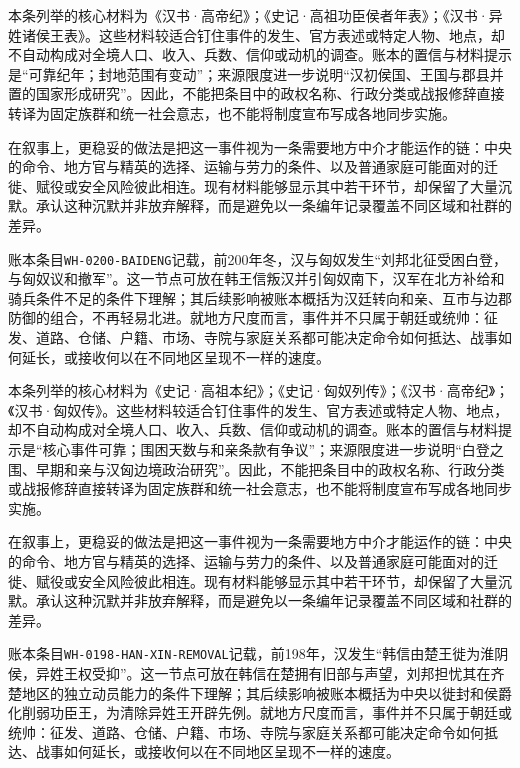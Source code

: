 本条列举的核心材料为《汉书·高帝纪》；《史记·高祖功臣侯者年表》；《汉书·异姓诸侯王表》。这些材料较适合钉住事件的发生、官方表述或特定人物、地点，却不自动构成对全境人口、收入、兵数、信仰或动机的调查。账本的置信与材料提示是“可靠纪年；封地范围有变动”；来源限度进一步说明“汉初侯国、王国与郡县并置的国家形成研究”。因此，不能把条目中的政权名称、行政分类或战报修辞直接转译为固定族群和统一社会意志，也不能将制度宣布写成各地同步实施。

在叙事上，更稳妥的做法是把这一事件视为一条需要地方中介才能运作的链：中央的命令、地方官与精英的选择、运输与劳力的条件、以及普通家庭可能面对的迁徙、赋役或安全风险彼此相连。现有材料能够显示其中若干环节，却保留了大量沉默。承认这种沉默并非放弃解释，而是避免以一条编年记录覆盖不同区域和社群的差异。

账本条目\texttt{WH-0200-BAIDENG}记载，前200年冬，汉与匈奴发生“刘邦北征受困白登，与匈奴议和撤军”。这一节点可放在韩王信叛汉并引匈奴南下，汉军在北方补给和骑兵条件不足的条件下理解；其后续影响被账本概括为汉廷转向和亲、互市与边郡防御的组合，不再轻易北进。就地方尺度而言，事件并不只属于朝廷或统帅：征发、道路、仓储、户籍、市场、寺院与家庭关系都可能决定命令如何抵达、战事如何延长，或接收何以在不同地区呈现不一样的速度。

本条列举的核心材料为《史记·高祖本纪》；《史记·匈奴列传》；《汉书·高帝纪》；《汉书·匈奴传》。这些材料较适合钉住事件的发生、官方表述或特定人物、地点，却不自动构成对全境人口、收入、兵数、信仰或动机的调查。账本的置信与材料提示是“核心事件可靠；围困天数与和亲条款有争议”；来源限度进一步说明“白登之围、早期和亲与汉匈边境政治研究”。因此，不能把条目中的政权名称、行政分类或战报修辞直接转译为固定族群和统一社会意志，也不能将制度宣布写成各地同步实施。

在叙事上，更稳妥的做法是把这一事件视为一条需要地方中介才能运作的链：中央的命令、地方官与精英的选择、运输与劳力的条件、以及普通家庭可能面对的迁徙、赋役或安全风险彼此相连。现有材料能够显示其中若干环节，却保留了大量沉默。承认这种沉默并非放弃解释，而是避免以一条编年记录覆盖不同区域和社群的差异。

账本条目\texttt{WH-0198-HAN-XIN-REMOVAL}记载，前198年，汉发生“韩信由楚王徙为淮阴侯，异姓王权受抑”。这一节点可放在韩信在楚拥有旧部与声望，刘邦担忧其在齐楚地区的独立动员能力的条件下理解；其后续影响被账本概括为中央以徙封和侯爵化削弱功臣王，为清除异姓王开辟先例。就地方尺度而言，事件并不只属于朝廷或统帅：征发、道路、仓储、户籍、市场、寺院与家庭关系都可能决定命令如何抵达、战事如何延长，或接收何以在不同地区呈现不一样的速度。


